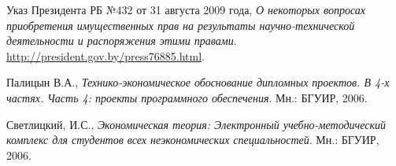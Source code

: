 \begin{thebibliography}{99}
  Указ Президента РБ №432 от 31 августа 2009 года,
  \emph{О некоторых вопросах приобретения имущественных прав на результаты научно-технической деятельности и распоряжения этими правами}.
  \href{http://president.gov.by/press76885.html}{http://president.gov.by/press76885.html}.

  Палицын В.А.,
  \emph{Технико-экономическое обоснование дипломных проектов. В 4-х частях. Часть 4: проекты программного обеспечения}.
  Мн.: БГУИР,
  2006.

  Светлицкий, И.С.,
  \emph{Экономическая теория: Электронный учебно-методический комплекс для студентов всех неэкономических специальностей}.
  Мн.: БГУИР,
  2006.


\end{thebibliography}
